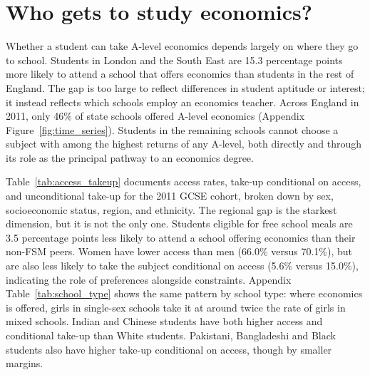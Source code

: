 \section{Who gets to study economics?}
\label{sec:Access}


Whether a student can take A-level economics depends largely on where they go to school. Students in London and the South East are 15.3 percentage points more likely to attend a school that offers economics than students in the rest of England. The gap is too large to reflect differences in student aptitude or interest; it instead reflects which schools employ an economics teacher. Across England in 2011, only 46\% of state schools offered A-level economics (Appendix Figure~\ref{fig:time_series}). Students in the remaining schools cannot choose a subject with among the highest returns of any A-level, both directly and through its role as the principal pathway to an economics degree.


Table~\ref{tab:access_takeup} documents access rates, take-up conditional on access, and unconditional take-up for the 2011 GCSE cohort, broken down by sex, socioeconomic status, region, and ethnicity. The regional gap is the starkest dimension, but it is not the only one. Students eligible for free school meals are 3.5 percentage points less likely to attend a school offering economics than their non-FSM peers. Women have lower access than men (66.0\% versus 70.1\%), but are also less likely to take the subject conditional on access (5.6\% versus 15.0\%), indicating the role of preferences alongside constraints. Appendix Table~\ref{tab:school_type} shows the same pattern by school type: where economics is offered, girls in single-sex schools take it at around twice the rate of girls in mixed schools. Indian and Chinese students have both higher access and conditional take-up than White students. Pakistani, Bangladeshi and Black students also have higher take-up conditional on access, though by smaller margins.




